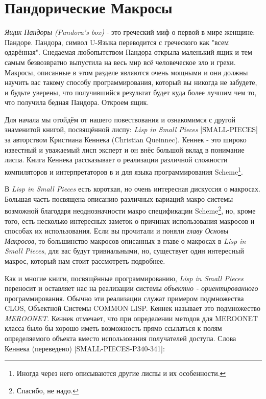\section{Пандорические Макросы}\label{section_pandoric_macros}



\emph{Ящик Пандоры (Pandora's box)} - это греческий миф о первой в мире женщине: Пандоре. Пандора, символ U-Языка переводится с греческого как "всем одарённая". Снедаемая любопытством Пандора открыла маленький ящик и тем самым безвозвратно выпустила на весь мир всё человеческое зло и грехи. Макросы, описанные в этом разделе являются очень мощными и они должны научить вас такому способу программирования, который вы никогда не забудете, и будьте уверены, что получившийся результат будет куда более лучшим чем то, что получила бедная Пандора. Откроем ящик.

Для начала мы отойдём от нашего повествования и ознакомимся с другой знаменитой книгой, посвящённой лиспу: \emph{Lisp in Small Pieces} [SMALL-PIECES] за авторством Кристиана Кеннека ({\Eng Christian Queinnec}). Кеннек - это широко известный и уважаемый лисп эксперт и он внёс большой вклад в понимание лиспа. Книга Кеннека рассказывает о реализации различной сложности компиляторов и интерпретаторов в и для языка программирования Scheme\footnote{Иногда через него описываются другие лиспы и их особенности.}.

 

В \emph{Lisp in Small Pieces} есть короткая, но очень интересная дискуссия о макросах. Большая часть посвящена описанию различных вариаций макро системы возможной благодаря неоднозначности макро спецификации Scheme\footnote{Спасибо, не надо.}, но, кроме того, есть несколько интересных заметок о причинах использования макросов и способах их использования. Если вы прочитали и поняли \emph{главу Основы Макросов}, то большинство макросов описанных в главе о макросах в \emph{Lisp in Small Pieces}, для вас будут тривиальными, но, существует один интересный макрос, который нам стоит рассмотреть подробнее.



Как и многие книги, посвящённые программированию, \emph{Lisp in Small Pieces} переносит и оставляет нас на реализации системы \emph{объектно - ориентированного} программирования. Обычно эти реализации служат примером подмножества CLOS, Объектной Системы COMMON LISP. Кеннек называет это подмножество \emph{MEROONET}. Кеннек отмечает, что при определении методов для MEROONET класса было бы хорошо иметь возможность прямо ссылаться к полям определяемого объекта вместо использования получателей доступа. Слова Кеннека (переведено) [SMALL-PIECES-P340-341]:

